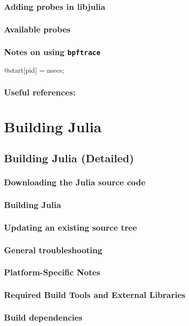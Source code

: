     \subsection{Adding probes in libjulia}
    \subsection{Available probes}
    \subsection{Notes on using \texttt{bpftrace}}
    @start[pid] = nsecs;
    \subsection{Useful references:}
  \chapter{Building Julia}
    \section{Building Julia (Detailed)}
    \subsection{Downloading the Julia source code}
    \subsection{Building Julia}
    \subsection{Updating an existing source tree}
    \subsection{General troubleshooting}
    \subsection{Platform-Specific Notes}
    \subsection{Required Build Tools and External Libraries}
    \subsection{Build dependencies}
